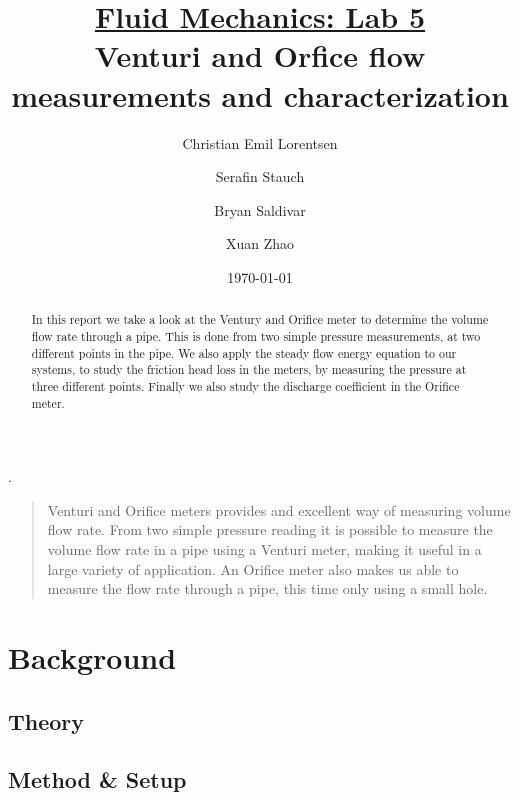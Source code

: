 \documentclass[%
 aapm,
 mph,%
 amsmath,amssymb,
 reprint,%
]{revtex4-2}
\begin{document}
\noindent
{}

\title[]{\underline{Fluid Mechanics: Lab 5} \\
Venturi and Orfice flow measurements and characterization}.%

\author{Christian Emil Lorentsen}%
\author{Serafin Stauch}
\author{Bryan Saldivar}
\author{Xuan Zhao}

\date{\today}%
\begin{abstract}
In this report we take a look at the Ventury and Orifice meter to determine the volume flow rate through a pipe. This is done from two simple pressure measurements, at two different points in the pipe. We also apply the steady flow energy equation to our systems, to study the friction head loss in the meters, by measuring the pressure at three different points. Finally we also study the discharge coefficient in the Orifice meter.

\end{abstract}

\maketitle
\linenumbers\relax %
\begin{quotation}
Venturi and Orifice meters provides and excellent way of measuring volume flow rate. From two simple pressure reading it is possible to measure the volume flow rate in a pipe using a Venturi meter, making it useful in a large variety of application. An Orifice meter also makes us able to measure the flow rate through a pipe, this time only using a small hole.

\end{quotation}
\section{\label{sec:level1}Background}

\subsection{\label{sec:level2}Theory}

\subsection{\label{sec_level3}Method \& Setup}
\end{document}
